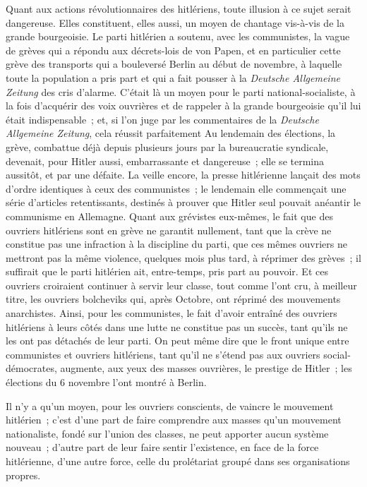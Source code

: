 \documentclass[french,twoside]{book} %
\begin{document}
Quant aux actions révolutionnaires des hitlériens, toute illusion à ce sujet serait dangereuse. Elles constituent, elles aussi, un moyen de chantage vis-à-vis de la grande bourgeoisie. Le parti hitlérien a soutenu, avec les commu­nistes, la vague de grèves qui a répondu aux décrets-lois de von Papen, et en particulier cette grève des transports qui a bouleversé Berlin au début de novembre, à laquelle toute la population a pris part et qui a fait pousser à la {\itshape Deutsche Allgemeine Zeitung} des cris d'alarme. C'était là un moyen pour le parti national-socialiste, à la fois d'acquérir des voix ouvrières et de rappeler à la grande bourgeoisie qu'il lui était indispensable ; et, si l'on juge par les commentaires de la {\itshape Deutsche Allgemeine Zeitung}, cela réussit parfaitement Au lendemain des élections, la grève, combattue déjà depuis plusieurs jours par la bureaucratie syndicale, devenait, pour Hitler aussi, embarrassante et dangereuse ; elle se termina aussitôt, et par une défaite. La veille encore, la presse hitlérienne lançait des mots d'ordre identiques à ceux des commu­nistes ; le lendemain elle commençait une série d'articles retentissants, desti­nés à prouver que Hitler seul pouvait anéantir le communisme en Allemagne. Quant aux grévistes eux-mêmes, le fait que des ouvriers hitlériens sont en grève ne garantit nullement, tant que la crève ne constitue pas une infraction à la discipline du parti, que ces mêmes ouvriers ne mettront pas la même violence, quelques mois plus tard, à réprimer des grèves ; il suffirait que le parti hitlérien ait, entre-temps, pris part au pouvoir. Et ces ouvriers croiraient continuer à servir leur classe, tout comme l'ont cru, à meilleur titre, les ouvriers bolcheviks qui, après Octobre, ont réprimé des mouvements anar­chistes. Ainsi, pour les communistes, le fait d'avoir entraîné des ouvriers hitlériens à leurs côtés dans une lutte ne constitue pas un succès, tant qu'ils ne les ont pas détachés de leur parti. On peut même dire que le front unique entre communistes et ouvriers hitlériens, tant qu'il ne s'étend pas aux ouvriers social-démocrates, augmente, aux yeux des masses ouvrières, le prestige de Hitler ; les élections du 6 novembre l'ont montré à Berlin.\par
Il n'y a qu'un moyen, pour les ouvriers conscients, de vaincre le mouve­ment hitlérien ; c'est d'une part de faire comprendre aux masses qu'un mouvement nationaliste, fondé sur l'union des classes, ne peut apporter aucun système nouveau ; d'autre part de leur faire sentir l'existence, en face de la force hitlérienne, d'une autre force, celle du prolétariat groupé dans ses organisations propres.\par
\end{document}

